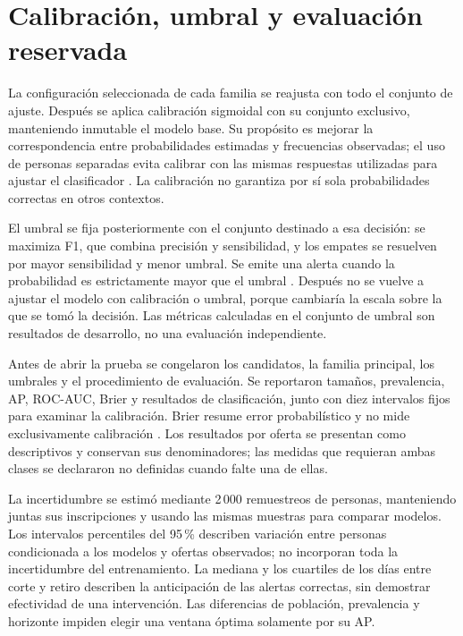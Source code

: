 \section{Calibración, umbral y evaluación reservada}
La configuración seleccionada de cada familia se reajusta con todo el conjunto de ajuste. Después se aplica calibración sigmoidal con su conjunto exclusivo, manteniendo inmutable el modelo base. Su propósito es mejorar la correspondencia entre probabilidades estimadas y frecuencias observadas; el uso de personas separadas evita calibrar con las mismas respuestas utilizadas para ajustar el clasificador \cite{modeloscalibracion2026}. La calibración no garantiza por sí sola probabilidades correctas en otros contextos.

El umbral se fija posteriormente con el conjunto destinado a esa decisión: se maximiza F1, que combina precisión y sensibilidad, y los empates se resuelven por mayor sensibilidad y menor umbral. Se emite una alerta cuando la probabilidad es estrictamente mayor que el umbral \cite{revthreshold}. Después no se vuelve a ajustar el modelo con calibración o umbral, porque cambiaría la escala sobre la que se tomó la decisión. Las métricas calculadas en el conjunto de umbral son resultados de desarrollo, no una evaluación independiente.

Antes de abrir la prueba se congelaron los candidatos, la familia principal, los umbrales y el procedimiento de evaluación. Se reportaron tamaños, prevalencia, AP, ROC-AUC, Brier y resultados de clasificación, junto con diez intervalos fijos para examinar la calibración. Brier resume error probabilístico y no mide exclusivamente calibración \cite{modeloscalibracion2026}. Los resultados por oferta se presentan como descriptivos y conservan sus denominadores; las medidas que requieran ambas clases se declararon no definidas cuando falte una de ellas.

La incertidumbre se estimó mediante 2\,000 remuestreos de personas, manteniendo juntas sus inscripciones y usando las mismas muestras para comparar modelos. Los intervalos percentiles del 95\,\% describen variación entre personas condicionada a los modelos y ofertas observados; no incorporan toda la incertidumbre del entrenamiento. La mediana y los cuartiles de los días entre corte y retiro describen la anticipación de las alertas correctas, sin demostrar efectividad de una intervención. Las diferencias de población, prevalencia y horizonte impiden elegir una ventana óptima solamente por su AP.



